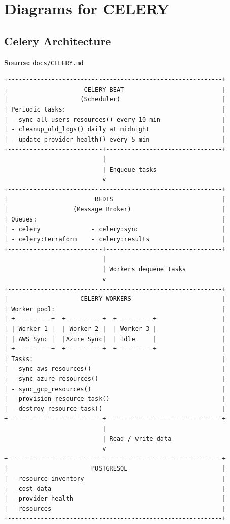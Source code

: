 \newpage
\section{Diagrams for CELERY}

\subsection{Celery Architecture}
\textbf{Source:} \texttt{docs/CELERY.md}
\begin{lstlisting}[numbers=none,basicstyle=\ttfamily\tiny,caption={Celery Architecture Adapted from docs/CELERY.md}]
+-----------------------------------------------------------+
|                     CELERY BEAT                           |
|                    (Scheduler)                            |
| Periodic tasks:                                           |
| - sync_all_users_resources() every 10 min                 |
| - cleanup_old_logs() daily at midnight                    |
| - update_provider_health() every 5 min                    |
+--------------------------+--------------------------------+
                           |
                           | Enqueue tasks
                           v
+-----------------------------------------------------------+
|                        REDIS                              |
|                  (Message Broker)                         |
| Queues:                                                   |
| - celery              - celery:sync                       |
| - celery:terraform    - celery:results                    |
+--------------------------+--------------------------------+
                           |
                           | Workers dequeue tasks
                           v
+-----------------------------------------------------------+
|                    CELERY WORKERS                         |
| Worker pool:                                              |
| +----------+  +----------+  +----------+                  |
| | Worker 1 |  | Worker 2 |  | Worker 3 |                  |
| | AWS Sync |  |Azure Sync|  | Idle     |                  |
| +----------+  +----------+  +----------+                  |
| Tasks:                                                    |
| - sync_aws_resources()                                    |
| - sync_azure_resources()                                  |
| - sync_gcp_resources()                                    |
| - provision_resource_task()                               |
| - destroy_resource_task()                                 |
+--------------------------+--------------------------------+
                           |
                           | Read / write data
                           v
+-----------------------------------------------------------+
|                       POSTGRESQL                          |
| - resource_inventory                                      |
| - cost_data                                               |
| - provider_health                                         |
| - resources                                               |
+-----------------------------------------------------------+
\end{lstlisting}

